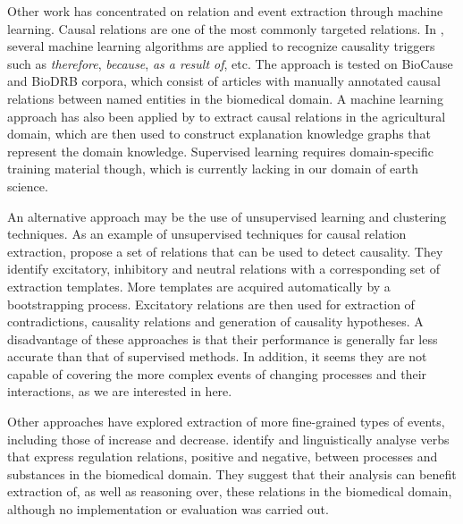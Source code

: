 \documentclass[10pt, a4paper]{article}
\begin{document}
Other work has concentrated on relation and event extraction through machine learning. 
Causal relations are one of the most commonly targeted relations.
In \cite{Mihaila2013}, several machine learning algorithms are applied to recognize causality triggers such as \emph{therefore}, \emph{because}, \emph{as a result of}, etc.
The approach is tested on BioCause \cite{Mihaila2013BioCause} and BioDRB \cite{Prasad2011Biomedical} corpora, which consist of articles with manually annotated causal relations between named entities in the biomedical domain. 
A machine learning approach has also been applied by  to extract causal relations in the agricultural domain, which are then used to construct explanation knowledge graphs that represent the domain knowledge.
Supervised learning requires domain-specific training material though, which is currently lacking in our domain of earth science.

An alternative approach may be the use of unsupervised learning and clustering techniques. 
As an example of unsupervised techniques for causal relation extraction,  propose a set of relations that can be used to detect causality. 
They identify excitatory, inhibitory and neutral relations with a corresponding set of extraction templates. 
More templates are acquired automatically by a bootstrapping process. 
Excitatory relations are then used for extraction of contradictions, causality relations and generation of causality hypotheses.
A disadvantage of these approaches is that their performance is generally far less accurate than that of supervised methods.
In addition, it seems they are not capable of covering the more complex events of changing processes and their interactions, as we are interested in here. 

Other approaches have explored extraction of more fine-grained types of events, including those of increase and decrease. 
 identify and linguistically analyse verbs that express regulation relations, positive and negative, between processes and substances in the biomedical domain. 
They suggest that their analysis can benefit extraction of, as well as reasoning over, these relations in the biomedical domain, although no implementation or evaluation was carried out.
\end{document}

